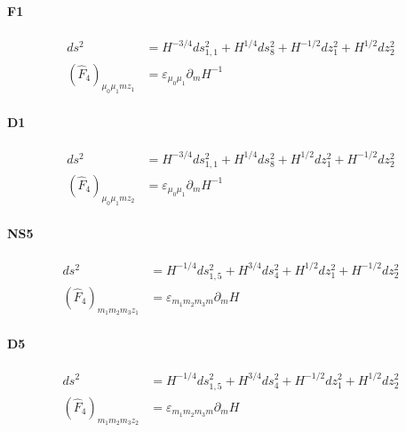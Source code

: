 \paragraph{F1}
\begin{equation}
\begin{aligned}
ds^2
&= H^{-3/4}ds_{1,1}^2
+ H^{1/4}ds_8^2
+H^{-1/2}dz_1^2
+H^{1/2}dz_2^2\\
(\widehat{F}_4)_{\mu_0 \mu_1 m z_1}
&= \varepsilon_{\mu_0 \mu_1}\partial_m H^{-1}
\end{aligned}
\end{equation}

\paragraph{D1}
\begin{equation}
\begin{aligned}
ds^2
&= H^{-3/4}ds_{1,1}^2
+ H^{1/4}ds_8^2
+H^{1/2}dz_1^2
+H^{-1/2}dz_2^2\\
(\widehat{F}_4)_{\mu_0 \mu_1 m z_2}
&= \varepsilon_{\mu_0 \mu_1}\partial_m H^{-1}
\end{aligned}
\end{equation}


\paragraph{NS5}
\begin{equation}
\begin{aligned}
ds^2
&= H^{-1/4}ds_{1,5}^2
+ H^{3/4}ds_4^2
+H^{1/2}dz_1^2
+H^{-1/2}dz_2^2\\
(\widehat{F}_4)_{m_1 m_2 m_3 z_1}
&= \varepsilon_{m_1 m_2 m_3 m}\partial_m H
\end{aligned}
\end{equation}

\paragraph{D5}
\begin{equation}
\begin{aligned}
ds^2
&= H^{-1/4}ds_{1,5}^2
+ H^{3/4}ds_4^2
+H^{-1/2}dz_1^2
+H^{1/2}dz_2^2\\
(\widehat{F}_4)_{m_1 m_2 m_3 z_2}
&= \varepsilon_{m_1 m_2 m_3 m}\partial_m H
\end{aligned}
\end{equation}


